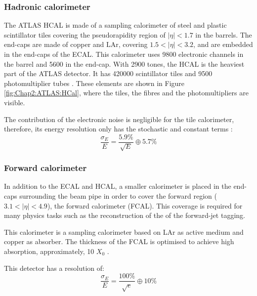 \subsubsection{Hadronic calorimeter}
\label{sec:Chap2:CALO:HCAL}
The ATLAS HCAL \cite{Cavallari_2011} is made of a sampling calorimeter of steel and plastic 
scintillator tiles covering the pseudorapidity region of $|\eta|<1.7$ in the barrels. The end-caps 
are made of copper and LAr, covering $1.5<|\eta|<3.2$, and are embedded in the end-caps of the ECAL.
 This calorimeter uses 9800 electronic channels in the barrel and 5600 in the end-cap. With 2900 tones, the HCAL is the heaviest part
 of the ATLAS detector. It has 420000 scintillator tiles and 9500 photomultiplier tubes \cite{ATLAS_Web_Detectors}. 
 These elements are shown in Figure \ref{fig:Chap2:ATLAS:HCal}, where the tiles, the fibres and the photomultipliers are visible.
 
 The contribution of the electronic noise is negligible for the tile calorimeter, therefore, its energy resolution only has
 the stochastic and constant terms \cite{Cavallari_2011}:
 \begin{equation*}
	\frac{\sigma_E}{E}=  \frac{5.9\%}{\sqrt{E}} \oplus 5.7 \%
\end{equation*}




\subsubsection{Forward calorimeter}
In addition to the ECAL and HCAL, a smaller calorimeter is placed in the end-caps surrounding 
the beam pipe in order to cover the forward region ($3.1<|\eta|<4.9$), the forward calorimeter (FCAL). 
This coverage is required for many physics tasks such as the reconstruction of the \MET of the forward-jet tagging.

This calorimeter is a sampling calorimeter based on LAr as active medium and copper as absorber. 
The thickness of the FCAL is optimised to achieve high absorption, approximately, 10 $X_0$ \cite{TarekAbouelfadlMohamed2020}.

This detector has a resolution of:
 \begin{equation*}
	\frac{\sigma_E}{E}=  \frac{100\%}{\sqrt{e}} \oplus 10 \%
\end{equation*}



